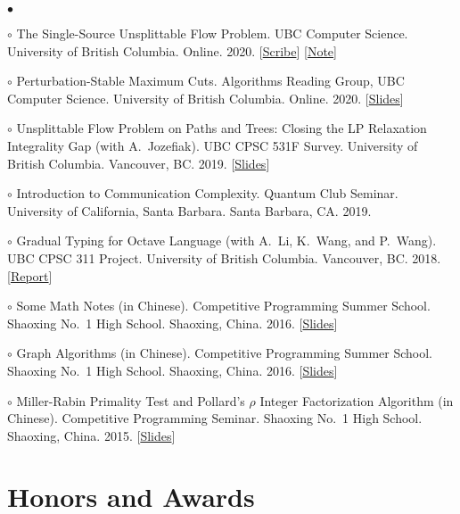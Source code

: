 \documentclass[margin,line]{res}
\newenvironment{list2}{
  \begin{list}{$\bullet$}{%
      \setlength{\itemsep}{0in}
      \setlength{\parsep}{0in} \setlength{\parskip}{0in}
      \setlength{\topsep}{0in} \setlength{\partopsep}{0in}
      \setlength{\leftmargin}{0.2in}}}{\end{list}}
\begin{document}
\begin{resume}
\begin{list2}
\item[$\circ$] The Single-Source Unsplittable Flow Problem. UBC Computer Science. University of British Columbia. Online. 2020. [\href{http://ypan.me/docs/ssufp-scribe.pdf}{Scribe}] [\href{http://ypan.me/docs/ssufp-note.pdf}{Note}]
\item[$\circ$] Perturbation-Stable Maximum Cuts. Algorithms Reading Group, UBC Computer Science. University of British Columbia. Online. 2020. [\href{http://ypan.me/docs/maxcut.pdf}{Slides}]
\item[$\circ$] Unsplittable Flow Problem on Paths and Trees: Closing the LP Relaxation Integrality Gap (with A.\ Jozefiak). UBC CPSC 531F Survey. University of British Columbia. Vancouver, BC. 2019. [\href{http://ypan.me/docs/ufp-slides.pdf}{Slides}]
\item[$\circ$] Introduction to Communication Complexity. Quantum Club Seminar. University of California, Santa Barbara. Santa Barbara, CA. 2019.
\item[$\circ$] Gradual Typing for Octave Language (with A.\ Li, K.\ Wang, and P.\ Wang). UBC CPSC 311 Project. University of British Columbia. Vancouver, BC. 2018. [\href{http://ypan.me/docs/gradual-octave.pdf}{Report}]
\item[$\circ$] Some Math Notes (in Chinese). Competitive Programming Summer School. Shaoxing No.\ 1 High School. Shaoxing, China. 2016. [\href{http://ypan.me/docs/math.pdf}{Slides}]
\item[$\circ$] Graph Algorithms (in Chinese). Competitive Programming Summer School. Shaoxing No.\ 1 High School. Shaoxing, China. 2016. [\href{http://ypan.me/docs/graph.pdf}{Slides}]
\item[$\circ$] Miller-Rabin Primality Test and Pollard's $\rho$ Integer Factorization Algorithm (in Chinese). Competitive Programming Seminar. Shaoxing No.\ 1 High School. Shaoxing, China. 2015. [\href{http://ypan.me/docs/miller-rabin-pollard-rho.pdf}{Slides}]
\end{list2}


\section{\sc Honors and Awards}


\end{resume}
\end{document}
